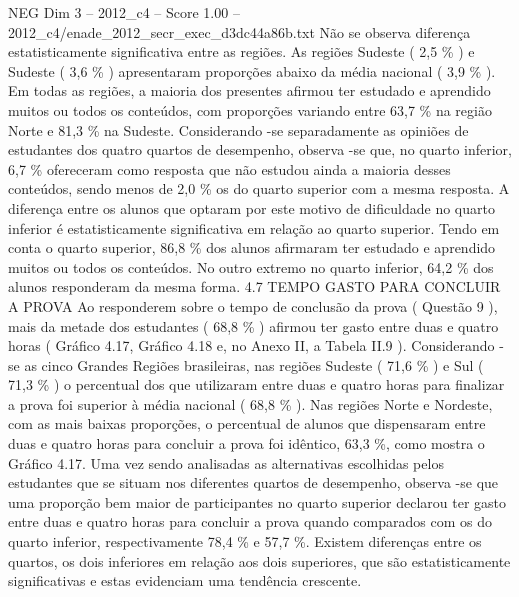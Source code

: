 \begin{textsample}{NEG Dim 3 – 2012\_c4 – Score 1.00 – 2012\_c4/enade\_2012\_secr\_exec\_d3dc44a86b.txt}
Não se observa diferença estatisticamente significativa entre as regiões.
As regiões Sudeste ( 2,5 \% ) e Sudeste ( 3,6 \% ) apresentaram proporções abaixo da média nacional ( 3,9 \% ).
Em todas as regiões, a maioria dos presentes afirmou ter estudado e aprendido muitos ou todos os conteúdos, com proporções variando entre 63,7 \% na região Norte e 81,3 \% na Sudeste.
Considerando -se separadamente as opiniões de estudantes dos quatro quartos de desempenho, observa -se que, no quarto inferior, 6,7 \% ofereceram como resposta que não estudou ainda a maioria desses conteúdos, sendo menos de 2,0 \% os do quarto superior com a mesma resposta.
A diferença entre os alunos que optaram por este motivo de dificuldade no quarto inferior é estatisticamente significativa em relação ao quarto superior.
Tendo em conta o quarto superior, 86,8 \% dos alunos afirmaram ter estudado e aprendido muitos ou todos os conteúdos.
No outro extremo no quarto inferior, 64,2 \% dos alunos responderam da mesma forma. 4.7 TEMPO GASTO PARA CONCLUIR A PROVA Ao responderem sobre o tempo de conclusão da prova ( Questão 9 ), mais da metade dos estudantes ( 68,8 \% ) afirmou ter gasto entre duas e quatro horas ( Gráfico 4.17, Gráfico 4.18 e, no Anexo II, a Tabela II.9 ).
Considerando -se as cinco Grandes Regiões brasileiras, nas regiões Sudeste ( 71,6 \% ) e Sul ( 71,3 \% ) o percentual dos que utilizaram entre duas e quatro horas para finalizar a prova foi superior à média nacional ( 68,8 \% ).
Nas regiões Norte e Nordeste, com as mais baixas proporções, o percentual de alunos que dispensaram entre duas e quatro horas para concluir a prova foi idêntico, 63,3 \%, como mostra o Gráfico 4.17.
Uma vez sendo analisadas as alternativas escolhidas pelos estudantes que se situam nos diferentes quartos de desempenho, observa -se que uma proporção bem maior de participantes no quarto superior declarou ter gasto entre duas e quatro horas para concluir a prova quando comparados com os do quarto inferior, respectivamente 78,4 \% e 57,7 \%.
Existem diferenças entre os quartos, os dois inferiores em relação aos dois superiores, que são estatisticamente significativas e estas evidenciam uma tendência crescente.

\end{textsample}
